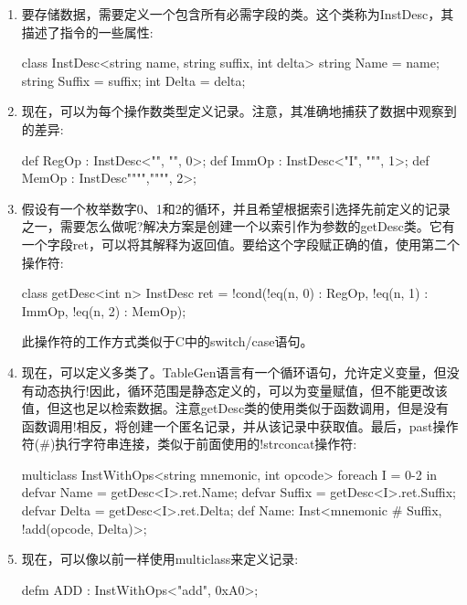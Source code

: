 \begin{enumerate}
\item
要存储数据，需要定义一个包含所有必需字段的类。这个类称为InstDesc，其描述了指令的一些属性:

\begin{shell}
class InstDesc<string name, string suffix, int delta> {
    string Name = name;
    string Suffix = suffix;
    int Delta = delta;
}
\end{shell}

\item
现在，可以为每个操作数类型定义记录。注意，其准确地捕获了数据中观察到的差异:

\begin{shell}
def RegOp : InstDesc<"", "", 0>;
def ImmOp : InstDesc<"I", """, 1>;
def MemOp : InstDesc"""","""", 2>;
\end{shell}

\item
假设有一个枚举数字0、1和2的循环，并且希望根据索引选择先前定义的记录之一，需要怎么做呢?解决方案是创建一个以索引作为参数的getDesc类。它有一个字段ret，可以将其解释为返回值。要给这个字段赋正确的值，使用第二个操作符:

\begin{shell}
class getDesc<int n> {
    InstDesc ret = !cond(!eq(n, 0) : RegOp,
                         !eq(n, 1) : ImmOp,
                         !eq(n, 2) : MemOp);
}
\end{shell}

此操作符的工作方式类似于C中的switch/case语句。

\item
现在，可以定义多类了。TableGen语言有一个循环语句，允许定义变量，但没有动态执行!因此，循环范围是静态定义的，可以为变量赋值，但不能更改该值，但这也足以检索数据。注意getDesc类的使用类似于函数调用，但是没有函数调用!相反，将创建一个匿名记录，并从该记录中获取值。最后，past操作符(\#)执行字符串连接，类似于前面使用的!strconcat操作符:

\begin{shell}
multiclass InstWithOps<string mnemonic, int opcode> {
    foreach I = 0-2 in {
        defvar Name = getDesc<I>.ret.Name;
        defvar Suffix = getDesc<I>.ret.Suffix;
        defvar Delta = getDesc<I>.ret.Delta;
        def Name: Inst<mnemonic # Suffix,
                            !add(opcode, Delta)>;
    }
}
\end{shell}

\item
现在，可以像以前一样使用multiclass来定义记录:

\begin{shell}
defm ADD : InstWithOps<"add", 0xA0>;
\end{shell}
\end{enumerate}

